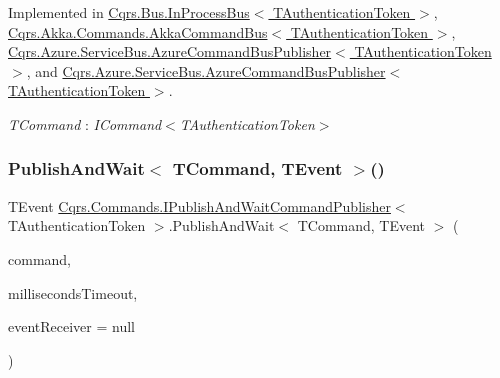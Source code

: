 Implemented in \hyperlink{classCqrs_1_1Bus_1_1InProcessBus_a38c0684e313f42bfb36b40703db94ccb_a38c0684e313f42bfb36b40703db94ccb}{Cqrs.\+Bus.\+In\+Process\+Bus$<$ T\+Authentication\+Token $>$}, \hyperlink{classCqrs_1_1Akka_1_1Commands_1_1AkkaCommandBus_a8e1291f0259ac80e393c02bb119159a5_a8e1291f0259ac80e393c02bb119159a5}{Cqrs.\+Akka.\+Commands.\+Akka\+Command\+Bus$<$ T\+Authentication\+Token $>$}, \hyperlink{classCqrs_1_1Azure_1_1ServiceBus_1_1AzureCommandBusPublisher_ab63045bffba3925270d0087e6fa4366f_ab63045bffba3925270d0087e6fa4366f}{Cqrs.\+Azure.\+Service\+Bus.\+Azure\+Command\+Bus\+Publisher$<$ T\+Authentication\+Token $>$}, and \hyperlink{classCqrs_1_1Azure_1_1ServiceBus_1_1AzureCommandBusPublisher_ab63045bffba3925270d0087e6fa4366f_ab63045bffba3925270d0087e6fa4366f}{Cqrs.\+Azure.\+Service\+Bus.\+Azure\+Command\+Bus\+Publisher$<$ T\+Authentication\+Token $>$}.

\begin{Desc}
\item[Type Constraints]\begin{description}
\item[{\em T\+Command} : {\em I\+Command$<$T\+Authentication\+Token$>$}]\end{description}
\end{Desc}
\mbox{\label{interfaceCqrs_1_1Commands_1_1IPublishAndWaitCommandPublisher_ad3761879cf9e09c9e89cabf8067b6de4_ad3761879cf9e09c9e89cabf8067b6de4}} 
\subsubsection{\texorpdfstring{Publish\+And\+Wait$<$ T\+Command, T\+Event $>$()}{PublishAndWait< TCommand, TEvent >()}\hspace{0.1cm}{\footnotesize\ttfamily [2/6]}}
{\footnotesize\ttfamily T\+Event \hyperlink{interfaceCqrs_1_1Commands_1_1IPublishAndWaitCommandPublisher}{Cqrs.\+Commands.\+I\+Publish\+And\+Wait\+Command\+Publisher}$<$ T\+Authentication\+Token $>$.Publish\+And\+Wait$<$ T\+Command, T\+Event $>$ (\begin{DoxyParamCaption}\item[{T\+Command}]{command,  }\item[{int}]{milliseconds\+Timeout,  }\item[{\hyperlink{interfaceCqrs_1_1Events_1_1IEventReceiver}{I\+Event\+Receiver}$<$ T\+Authentication\+Token $>$}]{event\+Receiver = {\ttfamily null} }\end{DoxyParamCaption})}



